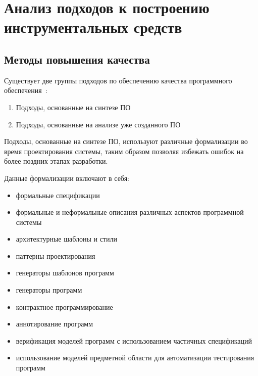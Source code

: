 \chapter{Анализ подходов к построению инструментальных средств}
\label{chap:analisys}
\section{Методы повышения качества}
\label{sec:quality_methods}

Существует две группы подходов по обеспечению качества программного
обеспечения~\cite{itsykson}:

\begin{enumerate}
    \item Подходы, основанные на синтезе ПО
    \item Подходы, основанные на анализе уже созданного ПО
\end{enumerate}

Подходы, основанные на синтезе ПО, используют различные формализации во время
проектирования системы, таким образом позволяя избежать ошибок на более поздних
этапах разработки.

Данные формализации включают в себя:

\begin{itemize}
    \item формальные спецификации
    \item формальные и неформальные описания различных аспектов программной
    системы
    \item архитектурные шаблоны и стили
    \item паттерны проектирования
    \item генераторы шаблонов программ
    \item генераторы программ
    \item контрактное программирование
    \item аннотирование программ
    \item верификация моделей программ с использованием частичных спецификаций
    \item использование моделей предметной области для автоматизации
    тестирования программ
\end{itemize}

